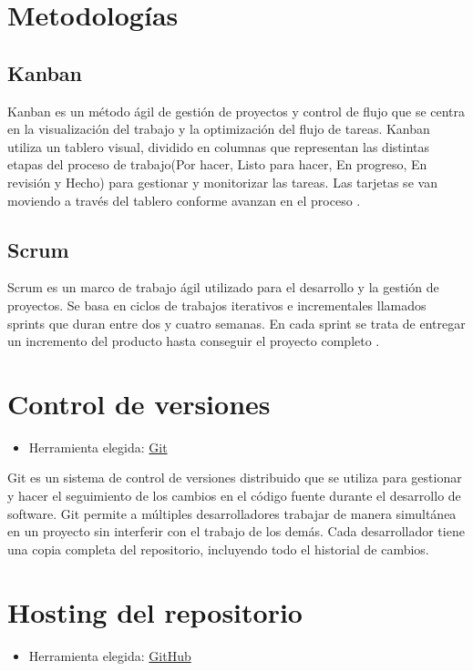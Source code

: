 
\section{Metodologías}

\subsection{Kanban}
Kanban es un método ágil de gestión de proyectos y control de flujo que se centra en la visualización del trabajo y la optimización del flujo de tareas. Kanban utiliza un tablero visual, dividido en columnas que representan las distintas etapas del proceso de trabajo(Por hacer, Listo para hacer, En progreso, En revisión y Hecho) para gestionar y monitorizar las tareas. Las tarjetas se van moviendo a través del tablero conforme avanzan en el proceso \cite{kanban:latex}.

\subsection{Scrum}
Scrum es un marco de trabajo ágil utilizado para el desarrollo y la gestión de proyectos. Se basa en ciclos de trabajos iterativos e incrementales llamados sprints que duran entre dos y cuatro semanas. En cada sprint se trata de entregar un incremento del producto hasta conseguir el proyecto completo \cite{scrum:latex}.

\section{Control de versiones}
\begin{itemize}
    \item Herramienta elegida: \href{https://git-scm.com/}{Git} 
\end{itemize}

Git es un sistema de control de versiones distribuido que se utiliza para gestionar y hacer el seguimiento de los cambios en el código fuente durante el desarrollo de software. Git permite a múltiples desarrolladores trabajar de manera simultánea en un proyecto sin interferir con el trabajo de los demás. Cada desarrollador tiene una copia completa del repositorio, incluyendo todo el historial de cambios.

\section{Hosting del repositorio}
\begin{itemize}
    \item Herramienta elegida: \href{https://github.com/}{GitHub} 
\end{itemize}

